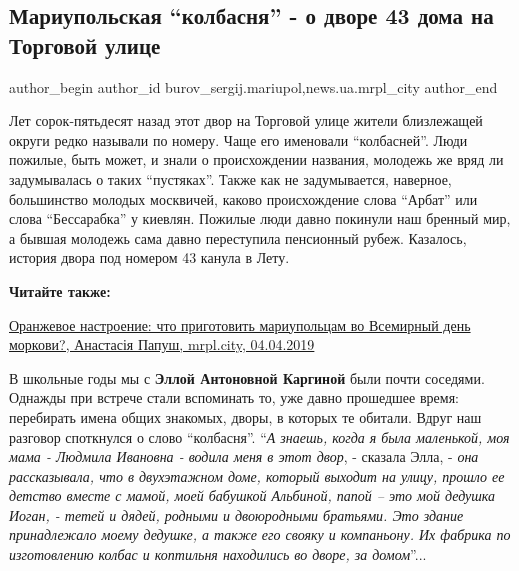  
 
 
 
 
 
\subsection{Мариупольская \enquote{колбасня} - о дворе 43 дома на Торговой улице}
\label{sec:06_04_2019.stz.news.ua.mrpl_city.1.mariupol_kolbasnja_dvor_43_doma_na_torgovoj}
 
\ifcmt
 author_begin
   author_id burov_sergij.mariupol,news.ua.mrpl_city
 author_end
\fi


Лет сорок-пятьдесят назад этот двор на Торговой улице жители близлежащей округи
редко называли по номеру. Чаще его именовали \enquote{колбасней}. Люди пожилые, быть
может, и знали о происхождении названия, молодежь же вряд ли задумывалась о
таких \enquote{пустяках}. Также как не задумывается, наверное, большинство молодых
москвичей, каково происхождение слова \enquote{Арбат} или слова \enquote{Бессарабка} у киевлян.
Пожилые люди давно покинули наш бренный мир, а бывшая молодежь сама давно
переступила пенсионный рубеж. Казалось, история двора под номером 43 канула в
Лету.

\textbf{Читайте также:} 

\href{https://mrpl.city/news/view/oranzhevoe-nastroenie-chto-prigotovit-mariupoltsam-vo-vsemirnyj-den-morkovi-foto}{%
Оранжевое настроение: что приготовить мариупольцам во Всемирный день моркови?, Анастасія Папуш, mrpl.city, 04.04.2019}


В школьные годы мы с \textbf{Эллой Антоновной Каргиной} были почти соседями. Однажды при
встрече стали вспоминать то, уже давно прошедшее время: перебирать имена общих
знакомых, дворы, в которых те обитали. Вдруг наш разговор споткнулся о слово
\enquote{колбасня}. \enquote{\emph{А знаешь, когда я была маленькой, моя мама - Людмила Ивановна -
водила меня в этот двор}, - сказала Элла, - \emph{она рассказывала, что в двухэтажном
доме, который выходит на улицу, прошло ее детство вместе с мамой, моей бабушкой
Альбиной, папой – это мой дедушка Иоган, - тетей и дядей, родными и двоюродными
братьями. Это здание принадлежало моему дедушке, а также его свояку и
компаньону. Их фабрика по изготовлению колбас и коптильня находились во дворе,
за домом}}...

